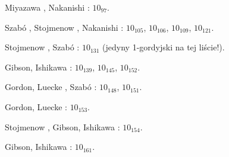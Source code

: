 \begin{compactitem}
\item Miyazawa \cite{miyazawa98}, Nakanishi \cite{nakanishi05}: $10_{97}$.
\item Szabó \cite{szabo05}, Stojmenow \cite{stoimenow04}, Nakanishi \cite{nakanishi05}: $10_{105}$, $10_{106}$, $10_{109}$, $10_{121}$.
\item Stojmenow \cite{stoimenow04}, Szabó \cite{szabo05}: $10_{131}$ (jedyny 1-gordyjski na tej liście!).
\item Gibson, Ishikawa \cite{ishikawa02}: $10_{139}$, $10_{145}$, $10_{152}$.
%
%
\item Gordon, Luecke \cite{gordon06}, Szabó \cite{szabo05}: $10_{148}$, $10_{151}$.
\item Gordon, Luecke \cite{gordon06}: $10_{153}$.
\item Stojmenow \cite{stoimenow03}, Gibson, Ishikawa \cite{ishikawa02}: $10_{154}$.
\item Gibson, Ishikawa \cite{ishikawa02}: $10_{161}$.
\end{compactitem}

